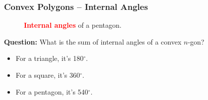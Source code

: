 \documentclass[aspectratio=169,11pt,svgnames]{beamer}
\begin{document}
\begin{frame}
 \frametitle{Convex Polygons -- Internal Angles}
 \begin{figure}[H]
  \caption*{\textcolor{Red}{\textbf{Internal angles}} of a pentagon.}
 \end{figure}
 \textbf{Question:} What is the sum of internal angles of a convex $n$-gon?
 \begin{itemize}[label=\textbullet]
  \item<2-> For a triangle, it's 180$^{ \circ }$.
  \item<3-> For a square, it's 360$^{\circ}$.
  \item<4-> For a pentagon, it's 540$^{ \circ }$.
 \end{itemize}
\end{frame}
\end{document}
